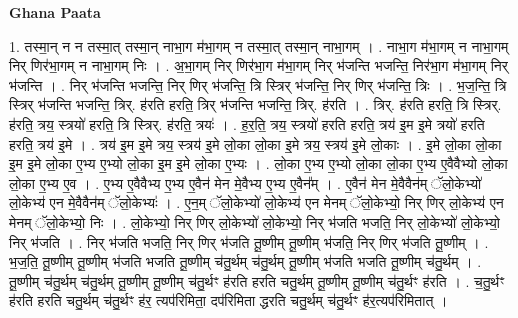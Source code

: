 \documentclass[17pt]{extarticle}
\begin{document}
\textbf{Ghana Paata } \newline

1. तस्मा॒न् न न तस्मा॒त् तस्मा॒न् नाभा॒ग म॑भा॒गम् न तस्मा॒त् तस्मा॒न् नाभा॒गम् । . नाभा॒ग म॑भा॒गम् न नाभा॒गम् निर् णिर॑भा॒गम् न नाभा॒गम् निः । . अ॒भा॒गम् निर् णिर॑भा॒ग म॑भा॒गम् निर् भ॑जन्ति भजन्ति॒ निर॑भा॒ग म॑भा॒गम् निर् भ॑जन्ति । . निर् भ॑जन्ति भजन्ति॒ निर् णिर् भ॑जन्ति॒ त्रि स्त्रिर् भ॑जन्ति॒ निर् णिर् भ॑जन्ति॒ त्रिः । . भ॒ज॒न्ति॒ त्रि स्त्रिर् भ॑जन्ति भजन्ति॒ त्रिर्. ह॑रति हरति॒ त्रिर् भ॑जन्ति भजन्ति॒ त्रिर्. ह॑रति । . त्रिर्. ह॑रति हरति॒ त्रि स्त्रिर्. ह॑रति॒ त्रय॒ स्त्रयो॑ हरति॒ त्रि स्त्रिर्. ह॑रति॒ त्रयः॑ । . ह॒र॒ति॒ त्रय॒ स्त्रयो॑ हरति हरति॒ त्रय॑ इ॒म इ॒मे त्रयो॑ हरति हरति॒ त्रय॑ इ॒मे । . त्रय॑ इ॒म इ॒मे त्रय॒ स्त्रय॑ इ॒मे लो॒का लो॒का इ॒मे त्रय॒ स्त्रय॑ इ॒मे लो॒काः । . इ॒मे लो॒का लो॒का इ॒म इ॒मे लो॒का ए॒भ्य ए॒भ्यो लो॒का इ॒म इ॒मे लो॒का ए॒भ्यः । . लो॒का ए॒भ्य ए॒भ्यो लो॒का लो॒का ए॒भ्य ए॒वैवैभ्यो लो॒का लो॒का ए॒भ्य ए॒व । . ए॒भ्य ए॒वैवैभ्य ए॒भ्य ए॒वैन॑ मेन मे॒वैभ्य ए॒भ्य ए॒वैन᳚म् । . ए॒वैन॑ मेन मे॒वैवैन॑म् ॅलो॒केभ्यो॑ लो॒केभ्य॑ एन मे॒वैवैन॑म् ॅलो॒केभ्यः॑ । . ए॒न॒म् ॅलो॒केभ्यो॑ लो॒केभ्य॑ एन मेनम् ॅलो॒केभ्यो॒ निर् णिर् लो॒केभ्य॑ एन मेनम् ॅलो॒केभ्यो॒ निः । . लो॒केभ्यो॒ निर् णिर् लो॒केभ्यो॑ लो॒केभ्यो॒ निर् भ॑जति भजति॒ निर् लो॒केभ्यो॑ लो॒केभ्यो॒ निर् भ॑जति । . निर् भ॑जति भजति॒ निर् णिर् भ॑जति तू॒ष्णीम् तू॒ष्णीम् भ॑जति॒ निर् णिर् भ॑जति तू॒ष्णीम् । . भ॒ज॒ति॒ तू॒ष्णीम् तू॒ष्णीम् भ॑जति भजति तू॒ष्णीम् च॑तु॒र्थम् च॑तु॒र्थम् तू॒ष्णीम् भ॑जति भजति तू॒ष्णीम् च॑तु॒र्थम् । . तू॒ष्णीम् च॑तु॒र्थम् च॑तु॒र्थम् तू॒ष्णीम् तू॒ष्णीम् च॑तु॒र्थꣳ ह॑रति हरति चतु॒र्थम् तू॒ष्णीम् तू॒ष्णीम् च॑तु॒र्थꣳ ह॑रति । . च॒तु॒र्थꣳ ह॑रति हरति चतु॒र्थम् च॑तु॒र्थꣳ ह॑र॒ त्यप॑रिमिता॒ दप॑रिमिता द्धरति चतु॒र्थम् च॑तु॒र्थꣳ ह॑र॒त्यप॑रिमितात् । \newline
\end{document}
